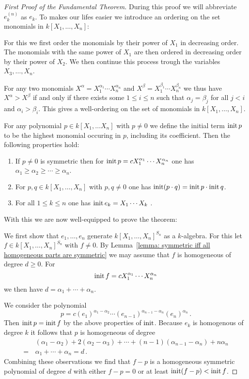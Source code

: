 \begin{proof}[First Proof of the Fundamental Theorem]
  During this proof we will abbreviate $e^{(n)}_k$ as $e_k$.
  To makes our lifes easier we introduce an ordering on the set monomials in $k[X_1, \dotsc, X_n]$:
  
  For this we first order the monomials by their power of $X_1$ in decreasing order.
  The monomials with the same power of $X_1$ are then ordered in decreasing order by their power of $X_2$.
  We then continue this process trough the variables $X_3, \dotsc, X_n$.
  
  For any two monomials $X^\alpha = X_1^{\alpha_1} \dotsm X_n^{\alpha_n}$ and $X^\beta = X_1^{\beta_1} \dotsm X_n^{\beta_n}$ we thus have $X^\alpha > X^\beta$ if and only if there exists some $1 \leq i \leq n$ such that $\alpha_j = \beta_j$ for all $j < i$ and $\alpha_i > \beta_i$.
  This gives a well-ordering on the set of monomials in $k[X_1, \dotsc, X_n]$.
  
  For any polynomial $p \in k[X_1, \dotsc X_n]$ with $p \neq 0$ we define the initial term $\operatorname{init} p$ to be the highest monomial occuring in $p$, including its coefficient.
  Then the following properties hold:
  \begin{enumerate}
    \item
      If $p \neq 0$ is symmetric then for $\operatorname{init} p = c X_1^{\alpha_1} \dotsm X_n^{\alpha_n}$ one has $\alpha_1 \geq \alpha_2 \geq \dotsb \geq \alpha_n$.
    \item
      For $p, q \in k[X_1, \dotsc, X_n]$ with $p, q \neq 0$ one has $\operatorname{init} (p \cdot q) = \operatorname{init} p \cdot \operatorname{init} q$.
    \item
      For all $1 \leq k \leq n$ one has $\operatorname{init} e_k = X_1 \dotsm X_k$ .
  \end{enumerate}
  With this we are now well-equipped to prove the theorem:
  
  We first show that $e_1, \dotsc, e_n$ generate $k[X_1, \dotsc, X_n]^{S_n}$ as a $k$-algebra.
  For this let $f \in k[X_1, \dotsc, X_n]^{S_n}$ with $f \neq 0$.
  By Lemma~\ref{lemma: symmetric iff all homogeneous parts are symmetric} we may assume that $f$ is homogeneous of degree $d \geq 0$.
  For
  \[
      \operatorname{init} f
    = c X_1^{\alpha_1} \dotsm X_n^{\alpha_n}
  \]
  we then have $d = \alpha_1 + \dotsb + \alpha_n$.
  
  We consider the polynomial
  \[
      p
    =         c
              \left( e_1 \right)^{\alpha_1 - \alpha_2}
      \dotsm  \left( e_{n-1} \right)^{\alpha_{n-1} - \alpha_n}
              \left( e_n \right)^{\alpha_n} \,.
  \]
  Then $\operatorname{init} p = \operatorname{init} f$ by the above properties of $\operatorname{init}$.
  Because $e_k$ is homogenous of degree $k$ it follows that $p$ is homogeneous of degree
  \begin{align*}
     &\,  (\alpha_1-\alpha_2) + 2(\alpha_2-\alpha_3) + \dotsb + (n-1)(\alpha_{n-1}-\alpha_n) + n\alpha_n \\
    =&\,  \alpha_1 + \dotsb + \alpha_n
    =     d \,.
  \end{align*}
  Combining these observations we find that $f-p$ is a homogeneous symmetric polynomial of degree $d$ with either $f-p = 0$ or at least $\operatorname{init} (f-p) < \operatorname{init} f$.
  

\end{proof}
